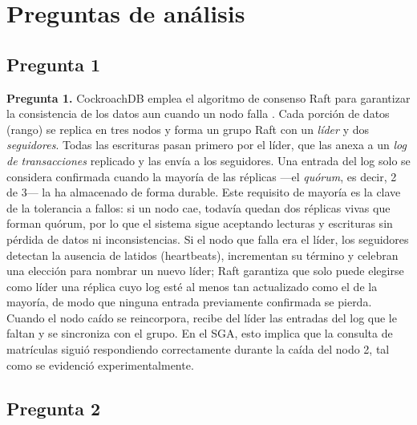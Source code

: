 \documentclass[10pt,a4paper]{article}
\begin{document}
\section{Preguntas de análisis}

\subsection*{Pregunta 1}

\textbf{Pregunta 1.} CockroachDB emplea el algoritmo de consenso Raft para garantizar
la consistencia de los datos aun cuando un nodo falla \cite{ongaro2014,taft2020}. Cada
porción de datos (rango) se replica en tres nodos y forma un grupo Raft con un
\emph{líder} y dos \emph{seguidores}. Todas las escrituras pasan primero por el líder,
que las anexa a un \emph{log de transacciones} replicado y las envía a los seguidores.
Una entrada del log solo se considera confirmada cuando la mayoría de las réplicas
—el \emph{quórum}, es decir, 2 de 3— la ha almacenado de forma durable. Este requisito
de mayoría es la clave de la tolerancia a fallos: si un nodo cae, todavía quedan dos
réplicas vivas que forman quórum, por lo que el sistema sigue aceptando lecturas y
escrituras sin pérdida de datos ni inconsistencias. Si el nodo que falla era el líder,
los seguidores detectan la ausencia de latidos (heartbeats), incrementan su término y
celebran una elección para nombrar un nuevo líder; Raft garantiza que solo puede
elegirse como líder una réplica cuyo log esté al menos tan actualizado como el de la
mayoría, de modo que ninguna entrada previamente confirmada se pierda. Cuando el nodo
caído se reincorpora, recibe del líder las entradas del log que le faltan y se
sincroniza con el grupo. En el SGA, esto implica que la consulta de matrículas siguió
respondiendo correctamente durante la caída del nodo 2, tal como se evidenció
experimentalmente.

\subsection*{Pregunta 2}
\end{document}
